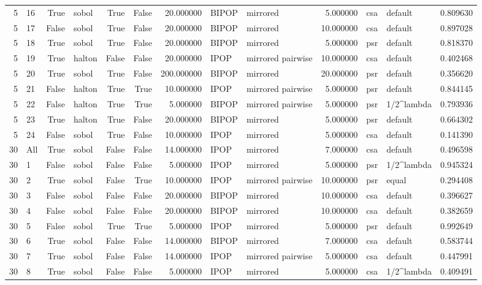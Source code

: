 \begin{tabular}{rlrlrrrllrllr}
5 & 16 & True & sobol & True & False & 20.000000 & BIPOP & mirrored & 5.000000 & csa & default & 0.809630 \\
5 & 17 & False & sobol & True & False & 20.000000 & BIPOP & mirrored & 10.000000 & csa & default & 0.897028 \\
5 & 18 & True & sobol & True & False & 20.000000 & BIPOP & mirrored & 5.000000 & psr & default & 0.818370 \\
5 & 19 & True & halton & False & False & 20.000000 & IPOP & mirrored pairwise & 10.000000 & csa & default & 0.402468 \\
5 & 20 & True & sobol & True & False & 200.000000 & BIPOP & mirrored & 20.000000 & psr & default & 0.356620 \\
5 & 21 & False & halton & True & True & 10.000000 & IPOP & mirrored pairwise & 5.000000 & psr & default & 0.844145 \\
5 & 22 & False & halton & True & True & 5.000000 & BIPOP & mirrored pairwise & 5.000000 & psr & 1/2^lambda & 0.793936 \\
5 & 23 & True & halton & True & False & 20.000000 & BIPOP & mirrored & 5.000000 & psr & default & 0.664302 \\
5 & 24 & False & sobol & True & False & 10.000000 & IPOP & mirrored & 5.000000 & csa & default & 0.141390 \\
30 & All & True & sobol & False & False & 14.000000 & IPOP & mirrored & 7.000000 & csa & default & 0.496598 \\
30 & 1 & False & sobol & False & False & 5.000000 & IPOP & mirrored & 5.000000 & psr & 1/2^lambda & 0.945324 \\
30 & 2 & True & sobol & False & True & 10.000000 & IPOP & mirrored pairwise & 10.000000 & psr & equal & 0.294408 \\
30 & 3 & False & sobol & False & False & 20.000000 & BIPOP & mirrored & 10.000000 & csa & default & 0.396627 \\
30 & 4 & False & sobol & False & False & 20.000000 & BIPOP & mirrored & 10.000000 & csa & default & 0.382659 \\
30 & 5 & False & sobol & True & True & 5.000000 & IPOP & mirrored & 5.000000 & psr & default & 0.992649 \\
30 & 6 & True & sobol & False & False & 14.000000 & BIPOP & mirrored & 7.000000 & csa & default & 0.583744 \\
30 & 7 & True & sobol & False & False & 14.000000 & IPOP & mirrored pairwise & 5.000000 & csa & default & 0.447991 \\
30 & 8 & True & sobol & False & False & 5.000000 & IPOP & mirrored & 5.000000 & csa & 1/2^lambda & 0.409491 \\

\end{tabular}
